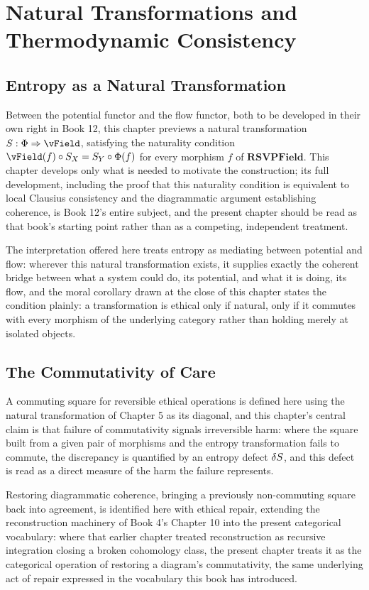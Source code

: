 \part{Natural Transformations and Thermodynamic Consistency}

\chapter{Entropy as a Natural Transformation}

Between the potential functor and the flow functor, both to be developed in their own right in Book 12, this chapter previews a natural transformation $\SEntropy: \PhiField \Rightarrow \vField$, satisfying the naturality condition $\vField(f) \circ \SEntropy_X = \SEntropy_Y \circ \PhiField(f)$ for every morphism $f$ of $\mathbf{RSVPField}$. This chapter develops only what is needed to motivate the construction; its full development, including the proof that this naturality condition is equivalent to local Clausius consistency and the diagrammatic argument establishing coherence, is Book 12's entire subject, and the present chapter should be read as that book's starting point rather than as a competing, independent treatment.

The interpretation offered here treats entropy as mediating between potential and flow: wherever this natural transformation exists, it supplies exactly the coherent bridge between what a system could do, its potential, and what it is doing, its flow, and the moral corollary drawn at the close of this chapter states the condition plainly: a transformation is ethical only if natural, only if it commutes with every morphism of the underlying category rather than holding merely at isolated objects.

\chapter{The Commutativity of Care}

A commuting square for reversible ethical operations is defined here using the natural transformation of Chapter 5 as its diagonal, and this chapter's central claim is that failure of commutativity signals irreversible harm: where the square built from a given pair of morphisms and the entropy transformation fails to commute, the discrepancy is quantified by an entropy defect $\delta S$, and this defect is read as a direct measure of the harm the failure represents.

Restoring diagrammatic coherence, bringing a previously non-commuting square back into agreement, is identified here with ethical repair, extending the reconstruction machinery of Book 4's Chapter 10 into the present categorical vocabulary: where that earlier chapter treated reconstruction as recursive integration closing a broken cohomology class, the present chapter treats it as the categorical operation of restoring a diagram's commutativity, the same underlying act of repair expressed in the vocabulary this book has introduced.

